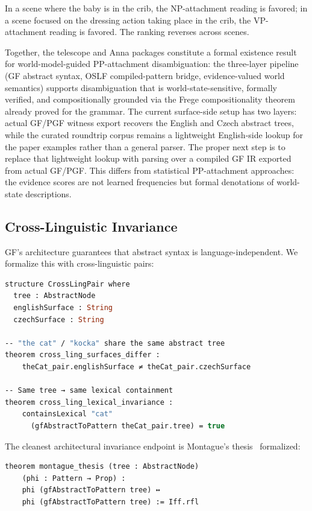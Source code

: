 \documentclass[11pt]{article}
\newcommand{\GF}{\textup{GF}}
\begin{document}
In a scene where the baby is in the crib, the NP-attachment reading is
favored; in a scene focused on the dressing action taking place in the crib,
the VP-attachment reading is favored.  The ranking reverses across scenes.

Together, the telescope and Anna packages constitute a formal existence result
for world-model-guided PP-attachment disambiguation: the three-layer pipeline
(GF abstract syntax, OSLF compiled-pattern bridge, evidence-valued world
semantics) supports disambiguation that is world-state-sensitive, formally
verified, and compositionally grounded via the Frege compositionality theorem
already proved for the grammar.  The current surface-side setup has two layers:
actual \GF{}/PGF witness export recovers the English and Czech abstract trees,
while the curated roundtrip corpus remains a lightweight English-side lookup for
the paper examples rather than a general parser.  The proper next step is to
replace that lightweight lookup with parsing over a compiled GF IR exported from
actual GF/PGF.  This differs from statistical PP-attachment approaches: the
evidence scores are not learned frequencies but formal denotations of
world-state descriptions.

\subsection{Cross-Linguistic Invariance}

\GF{}'s architecture guarantees that abstract syntax is language-independent.
We formalize this with cross-linguistic pairs:

\begin{lstlisting}[language=ml,caption={Cross-linguistic invariance}]
structure CrossLingPair where
  tree : AbstractNode
  englishSurface : String
  czechSurface : String

-- "the cat" / "kocka" share the same abstract tree
theorem cross_ling_surfaces_differ :
    theCat_pair.englishSurface ≠ theCat_pair.czechSurface

-- Same tree → same lexical containment
theorem cross_ling_lexical_invariance :
    containsLexical "cat"
      (gfAbstractToPattern theCat_pair.tree) = true
\end{lstlisting}

The cleanest architectural invariance endpoint is Montague's
thesis~\cite{Montague1973} formalized:

\begin{lstlisting}[language=ml]
theorem montague_thesis (tree : AbstractNode)
    (phi : Pattern → Prop) :
    phi (gfAbstractToPattern tree) ↔
    phi (gfAbstractToPattern tree) := Iff.rfl
\end{lstlisting}
\end{document}
